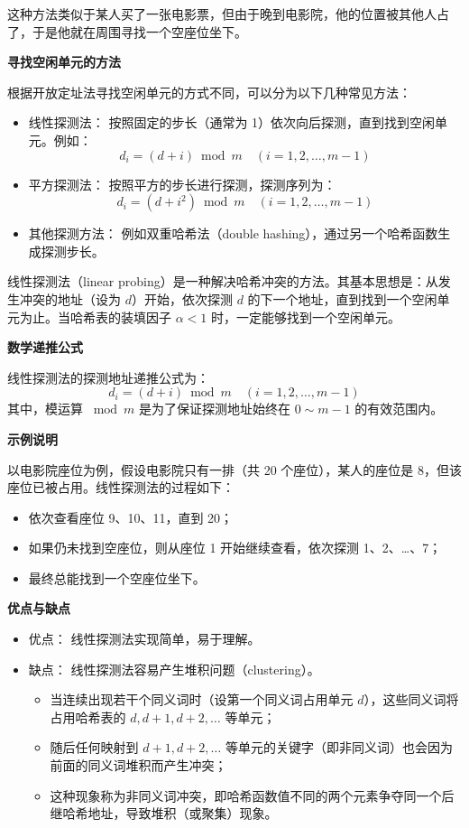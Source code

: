 \documentclass[lang=cn,newtx,10pt,scheme=chinese]{elegantbook}
\begin{document}
这种方法类似于某人买了一张电影票，但由于晚到电影院，他的位置被其他人占了，于是他就在周围寻找一个空座位坐下。


\textbf{寻找空闲单元的方法}  

根据开放定址法寻找空闲单元的方式不同，可以分为以下几种常见方法：
\begin{itemize}
  \item 线性探测法：  
    按照固定的步长（通常为 1）依次向后探测，直到找到空闲单元。例如：
    \[
    d_i = (d + i) \bmod m \quad (i = 1, 2, \dots, m-1)
    \]
  \item 平方探测法：  
    按照平方的步长进行探测，探测序列为：
    \[
    d_i = (d + i^2) \bmod m \quad (i = 1, 2, \dots, m-1)
    \]
  \item 其他探测方法：  
    例如双重哈希法（double hashing），通过另一个哈希函数生成探测步长。
\end{itemize}

线性探测法（linear probing）是一种解决哈希冲突的方法。其基本思想是：从发生冲突的地址（设为 $d$）开始，依次探测 $d$ 的下一个地址，直到找到一个空闲单元为止。当哈希表的装填因子 $\alpha < 1$ 时，一定能够找到一个空闲单元。


\textbf{数学递推公式}  

线性探测法的探测地址递推公式为：
\[
d_i = (d + i) \bmod m \quad (i = 1, 2, \dots, m-1)
\]
其中，模运算 $\bmod m$ 是为了保证探测地址始终在 $0 \sim m-1$ 的有效范围内。


\textbf{示例说明}  

以电影院座位为例，假设电影院只有一排（共 20 个座位），某人的座位是 8，但该座位已被占用。线性探测法的过程如下：
\begin{itemize}
  \item 依次查看座位 9、10、11，直到 20；
  \item 如果仍未找到空座位，则从座位 1 开始继续查看，依次探测 1、2、…、7；
  \item 最终总能找到一个空座位坐下。
\end{itemize}


\textbf{优点与缺点}  

\begin{itemize}
  \item 优点：  
    线性探测法实现简单，易于理解。
  \item 缺点：  
    线性探测法容易产生堆积问题（clustering）。  
    \begin{itemize}
      \item 当连续出现若干个同义词时（设第一个同义词占用单元 $d$），这些同义词将占用哈希表的 $d, d+1, d+2, \dots$ 等单元；
      \item 随后任何映射到 $d+1, d+2, \dots$ 等单元的关键字（即非同义词）也会因为前面的同义词堆积而产生冲突；
      \item 这种现象称为非同义词冲突，即哈希函数值不同的两个元素争夺同一个后继哈希地址，导致堆积（或聚集）现象。
    \end{itemize}
\end{itemize}
\end{document}

